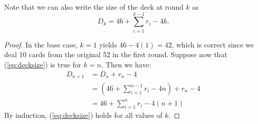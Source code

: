 \documentclass[11pt]{article}
\begin{document}
Note that we can also write the size of the deck at round $k$ as
\begin{equation}
  D_k = 46 + \sum_{i=1}^{k-1} r_i - 4k.
\label{eq:decksize} \end{equation}

\begin{proof}
  In the base case, $k=1$ yields $46-4(1) = 42$, which is correct since we deal 10 cards from the original 52 in the first round. Suppose now that (\ref{eq:decksize}) is true for $k=n$. Then we have:
    \begin{align}
      D_{n+1} &= D_n + r_n - 4 \\
      &= (46 + \sum_{i=1}^{n-1} r_i - 4n) + r_n - 4 \\
      &= 46 + \sum_{i=1}^n r_i - 4(n+1)
    \end{align}
  By induction, (\ref{eq:decksize}) holds for all values of $k$.
\end{proof}
\end{document}
